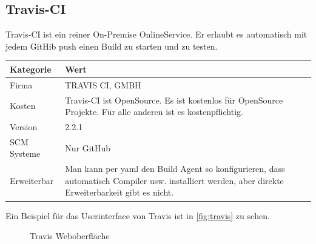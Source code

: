 \subsection{Travis-CI}
Travis-CI ist ein reiner On-Premise OnlineService. Er erlaubt es automatisch mit jedem GitHib push einen Build zu starten und zu testen.
\begin{center}
  \begin{tabularx}{\textwidth}{lX}
    \toprule
    Kategorie & Wert \\
    \midrule
    Firma &  TRAVIS CI, GMBH \\
		\addlinespace
    Kosten & Travis-CI ist OpenSource. Es ist kostenlos für OpenSource Projekte. Für alle anderen ist es kostenpflichtig.\\
		\addlinespace
		Version & 2.2.1 \\
		\addlinespace
		SCM Systeme & Nur GitHub\\
		\addlinespace
		Erweiterbar & Man kann per yaml den Build Agent so konfigurieren, dass automatisch Compiler usw. installiert werden, aber direkte Erweiterbarkeit gibt es nicht.\\
    \bottomrule
  \end{tabularx}
\end{center}
Ein Beispiel für das Userinterface von Travis ist in \autoref{fig:travis} zu sehen. 

\begin{figure}[H]
  \centering
  \caption{Travis Weboberfläche \cite{Travis-build}}\label{fig:travis.png}
\end{figure}